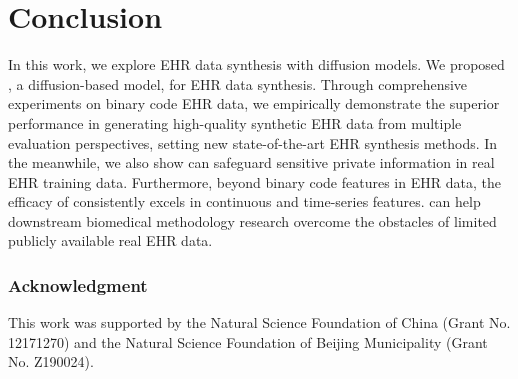 \section{Conclusion}

In this work, we explore EHR data synthesis with diffusion models. We proposed \modelname, a diffusion-based model, for EHR data synthesis. Through comprehensive experiments on binary code EHR data, we empirically demonstrate the superior performance in generating high-quality synthetic EHR data from multiple evaluation perspectives, setting new state-of-the-art EHR synthesis methods. In the meanwhile, we also show \modelname can safeguard sensitive private information in real EHR training data. Furthermore, beyond binary code features in EHR data, the efficacy of \modelname consistently excels in continuous and time-series features. \modelname can help downstream biomedical methodology research overcome the obstacles of limited publicly available real EHR data.

\subsubsection*{Acknowledgment}
This work was supported by the Natural Science Foundation of China (Grant No. 12171270) and the Natural Science Foundation of Beijing Municipality (Grant No. Z190024).

\newpage

